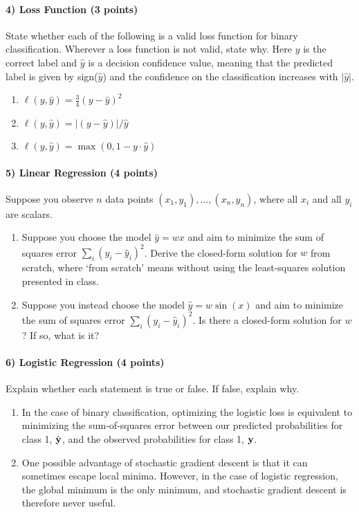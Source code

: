 \documentclass[11pt]{article}
\newcommand{\vy}{{\bf y}}
\begin{document}
	\paragraph{4) Loss Function (3 points)} State whether each of the following is a valid loss function 
	 for binary classification.  Wherever a loss function is not valid, state why. Here $y$ is the correct label and $\hat{y}$ is a decision confidence value, meaning that the predicted label is given by sign($\hat{y}$) and the confidence on the classification increases with $\vert\hat{y}\vert$.
	
	\begin{enumerate}
		\item $\ell (y, \hat{y}) = \frac{3}{4} (y-\hat{y})^2$
		\item $\ell (y, \hat{y}) = |(y-\hat{y})|/\hat{y}$
		\item $\ell (y, \hat{y}) = \max(0, 1 - y \cdot \hat{y})$
	\end{enumerate}
	
	\paragraph{5) Linear Regression (4 points)} Suppose you observe $n$ data points $(x_1, y_1), \ldots, (x_n, y_n)$, where all $x_i$ and all $y_i$ are scalars.
	\begin{enumerate}
		\item Suppose you choose the model $\hat{y} = w x$ and aim to minimize the sum of squares error $\sum_i (y_i - \hat{y}_i)^2$. Derive the closed-form solution for $w$ from scratch, where `from scratch' means without using the least-squares solution presented in class.
		\item Suppose you instead choose the model $\hat{y} = w \sin(x)$ and aim to minimize the sum of squares error $\sum_i (y_i - \hat{y}_i)^2$. Is there a closed-form solution for $w$? If so, what is it?
	\end{enumerate}
	
	\paragraph{6) Logistic Regression (4 points)} Explain whether each statement is true or false. If false, explain why.
	\begin{enumerate}
		\item In the case of binary classification, optimizing the logistic loss is equivalent to minimizing the sum-of-squares error between our predicted probabilities for class 1, $\hat{\vy}$, and the observed probabilities for class 1, $\vy$.
		\item One possible advantage of stochastic gradient descent is that it can sometimes escape local minima. However, in the case of logistic regression, the global minimum is the only minimum, and stochastic gradient descent is therefore never useful.
	\end{enumerate}
	
\end{document}
